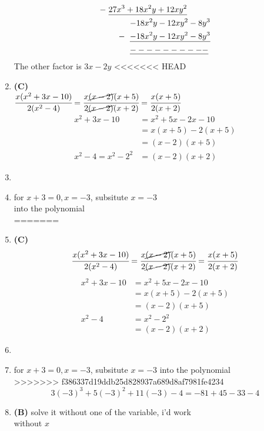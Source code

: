 \begin{multicols}{2}
\begin{enumerate}[label={\textbf{\arabic*.}}]
\begin{align*}
      -\hspace{-3pt} & \hspace{6pt} \underline{27x^3 + 18x^2y + 12xy^2} \\
      & \hspace{32pt} {-18x^2y - 12xy^2 - 8y^3} \\
     -\hspace{-26pt} & \hspace{32pt} \underline{-18x^2y - 12xy^2 -8y^3}\\
     & \hspace{32pt} \underline{----------}
    \end{align*}
    The other factor is $3x - 2y$
<<<<<<< HEAD
    \item \textbf{(C)} \\
    $\cfrac{x(x^2 + 3x - 10)}{2(x^2 - 4)} = \cfrac{x\cancel{(x-2)}(x+5)}{2\cancel{(x-2)}(x+2)} = \cfrac{x(x+5)}{2(x+2)}$ \\
    \begin{align*}
    x^2 + 3x - 10 &= x^2 + 5x - 2x - 10 \\ 
    &= x(x+5) -2(x+5) \\ 
    &= (x-2)(x+5) \\
    x^2 - 4 = x^2 - 2^2 &= (x-2)(x+2) 
    \end{align*}
    \item 
    \item for $x+3 = 0 , x = -3$, subsitute ${x=-3}$ \\
    into the polynomial \\
=======
\item \textbf{(C)} \\
    \[\cfrac{x(x^2 + 3x - 10)}{2(x^2 - 4)} = \cfrac{x\cancel{(x-2)}(x+5)}{2\cancel{(x-2)}(x+2)} = \cfrac{x(x+5)}{2(x+2)}\]
        \begin{align*}
        x^2 + 3x - 10 &= x^2 + 5x - 2x - 10 \\ 
        &= x(x+5) - 2(x+5) \\ 
        &= (x-2)(x+5) \\
        x^2 - 4 &= x^2 - 2^2 \\ 
        &= (x-2)(x+2)
        \end{align*}    
\item 
\item for $x+3 = 0 , x = -3$, subsitute $x=-3$ into the polynomial \\
>>>>>>> f386337d19ddb25d828937a689d8af7981fe4234
    $$3(-3)^3 + 5(-3)^2 + 11(-3) - 4 = -81 + 45 -33 - 4$$ 
    \item \textbf{(B)} solve it without one of the variable, i'd work \\ without $x$ 

\end{enumerate}
\end{multicols}
